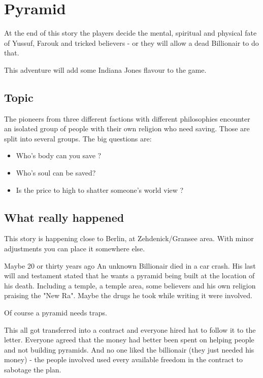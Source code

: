
\chapter{Pyramid}
\label{ch:adventure pyramid}

At the end of this story the players decide the mental, spiritual and physical fate of Yussuf, Farouk and tricked believers - or they will allow a dead Billionair to do that.

This adventure will add some Indiana Jones flavour to the game.

\section{Topic}

The pioneers from three different factions with different philosophies encounter an isolated group of people with their own religion who need saving. Those are split into several groups. The big questions are:

\begin{itemize}
    \item Who's body can you save ?
    \item Who's soul can be saved?
    \item Is the price to high to shatter someone's world view ?
\end{itemize}

\section{What really happened}

This story is happening close to Berlin, at Zehdenick/Gransee area. With minor adjustments you can place it somewhere else.

Maybe 20 or thirty years ago An unknown Billionair died in a car crash. His last will and testament stated that he wants a pyramid being built at the location of his death. Including a temple, a temple area, some believers and his own religion praising the "New Ra". Maybe the drugs he took while writing it were involved.

Of course a pyramid needs traps.

This all got transferred into a contract and everyone hired hat to follow it to the letter. Everyone agreed that the money had better been spent on helping people and not building pyramids. And no one liked the billionair (they just needed his money) - the people involved used every available freedom in the contract to sabotage the plan.

